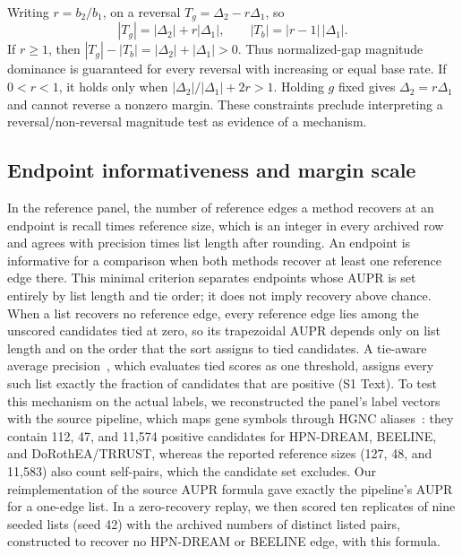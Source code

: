 \documentclass[10pt,letterpaper]{article}
\begin{document}
Writing $r=b_2/b_1$, on a reversal $T_g=\Delta_2-r\Delta_1$, so
\begin{equation}
|T_g|=|\Delta_2|+r|\Delta_1|,\qquad |T_b|=|r-1|\,|\Delta_1|.
\end{equation}
If $r\ge1$, then $|T_g|-|T_b|=|\Delta_2|+|\Delta_1|>0$. Thus normalized-gap magnitude dominance is guaranteed for every reversal with increasing or equal base rate. If $0<r<1$, it holds only when $|\Delta_2|/|\Delta_1|+2r>1$. Holding $g$ fixed gives $\Delta_2=r\Delta_1$ and cannot reverse a nonzero margin. These constraints preclude interpreting a reversal/non-reversal magnitude test as evidence of a mechanism.

\subsection*{Endpoint informativeness and margin scale}
In the reference panel, the number of reference edges a method recovers at an endpoint is recall times reference size, which is an integer in every archived row and agrees with precision times list length after rounding. An endpoint is informative for a comparison when both methods recover at least one reference edge there. This minimal criterion separates endpoints whose AUPR is set entirely by list length and tie order; it does not imply recovery above chance. When a list recovers no reference edge, every reference edge lies among the unscored candidates tied at zero, so its trapezoidal AUPR depends only on list length and on the order that the sort assigns to tied candidates. A tie-aware average precision~\cite{pedregosa2011sklearn}, which evaluates tied scores as one threshold, assigns every such list exactly the fraction of candidates that are positive (S1 Text). To test this mechanism on the actual labels, we reconstructed the panel's label vectors with the source pipeline, which maps gene symbols through HGNC aliases~\cite{seal2023hgnc}: they contain 112, 47, and 11{,}574 positive candidates for HPN-DREAM, BEELINE, and DoRothEA/TRRUST, whereas the reported reference sizes (127, 48, and 11{,}583) also count self-pairs, which the candidate set excludes. Our reimplementation of the source AUPR formula gave exactly the pipeline's AUPR for a one-edge list. In a zero-recovery replay, we then scored ten replicates of nine seeded lists (seed 42) with the archived numbers of distinct listed pairs, constructed to recover no HPN-DREAM or BEELINE edge, with this formula.
\end{document}
